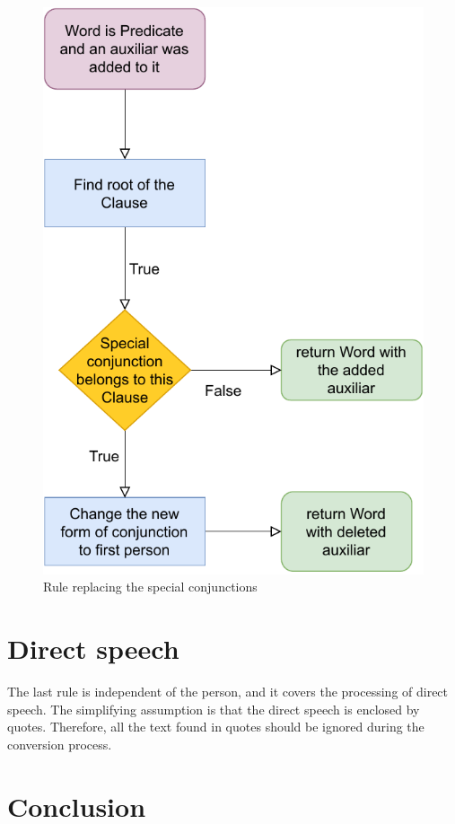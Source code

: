 \begin{figure}[!htbp]
\includegraphics[]{data/Erich-Conjs-Rule.pdf}
\caption{Rule replacing the special conjunctions}
\label{fig:erich-conjs-rule}
\end{figure}


\section{Direct speech}

The last rule is independent of the person, and it covers the processing of direct speech. The simplifying assumption is that the direct speech is enclosed by quotes. Therefore, all the text found in quotes should be ignored during the conversion process.

\section*{Conclusion}

